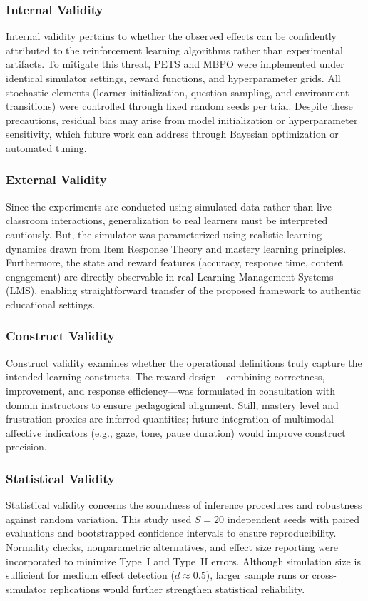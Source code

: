 \documentclass[preprint,12pt]{elsarticle}
\begin{document}
\begin{frontmatter}
\subsubsection{Internal Validity}
Internal validity pertains to whether the observed effects can be confidently attributed to the reinforcement learning algorithms rather than experimental artifacts.  
To mitigate this threat, PETS and MBPO were implemented under identical simulator settings, reward functions, and hyperparameter grids.  
All stochastic elements (learner initialization, question sampling, and environment transitions) were controlled through fixed random seeds per trial.  
Despite these precautions, residual bias may arise from model initialization or hyperparameter sensitivity, which future work can address through Bayesian optimization or automated tuning.

\subsubsection{External Validity}
Since the experiments are conducted using simulated data rather than live classroom interactions, generalization to real learners must be interpreted cautiously.  
But, the simulator was parameterized using realistic learning dynamics drawn from Item Response Theory and mastery learning principles.  
Furthermore, the state and reward features (accuracy, response time, content engagement) are directly observable in real Learning Management Systems (LMS), enabling straightforward transfer of the proposed framework to authentic educational settings.

\subsubsection{Construct Validity}
Construct validity examines whether the operational definitions truly capture the intended learning constructs.  
The reward design—combining correctness, improvement, and response efficiency—was formulated in consultation with domain instructors to ensure pedagogical alignment.  
Still, mastery level and frustration proxies are inferred quantities; future integration of multimodal affective indicators (e.g., gaze, tone, pause duration) would improve construct precision.

\subsubsection{Statistical Validity}
Statistical validity concerns the soundness of inference procedures and robustness against random variation.  
This study used $S=20$ independent seeds with paired evaluations and bootstrapped confidence intervals to ensure reproducibility.  
Normality checks, nonparametric alternatives, and effect size reporting were incorporated to minimize Type~I and Type~II errors.  
Although simulation size is sufficient for medium effect detection ($d \approx 0.5$), larger sample runs or cross-simulator replications would further strengthen statistical reliability.


\end{frontmatter}
\end{document}
